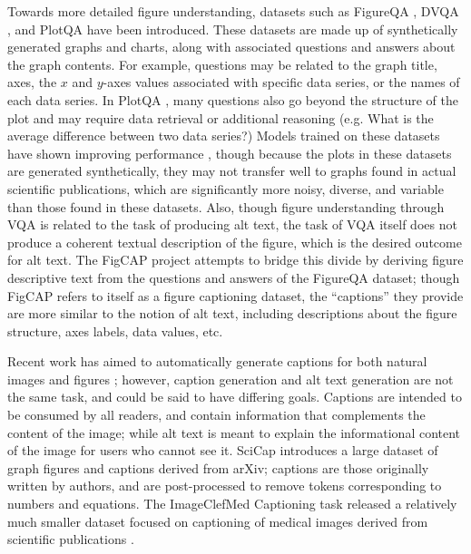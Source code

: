 \documentclass[sigconf]{acmart}
\begin{document}
Towards more detailed figure understanding, datasets such as FigureQA \citep{Kahou2018FigureQAAA}, DVQA \citep{Kafle2018DVQAUD}, and PlotQA \citep{Methani2020PlotQARO} have been introduced. These datasets are made up of synthetically generated graphs and charts, along with associated questions and answers about the graph contents. For example, questions may be related to the graph title, axes, the $x$ and $y$-axes values associated with specific data series, or the names of each data series. In PlotQA \citep{Kafle2018DVQAUD}, many questions also go beyond the structure of the plot and may require data retrieval or additional reasoning (e.g. What is the average difference between two data series?) Models trained on these datasets have shown improving performance \citep{Kahou2018FigureQAAA, Levy2021ClassificationRegressionFC}, though because the plots in these datasets are generated synthetically, they may not transfer well to graphs found in actual scientific publications, which are significantly more noisy, diverse, and variable than those found in these datasets. Also, though figure understanding through VQA is related to the task of producing alt text, the task of VQA itself does not produce a coherent textual description of the figure, which is the desired outcome for alt text. The FigCAP project \citep{Chen2019NeuralCG, Chen2019FigureCW} attempts to bridge this divide by deriving figure descriptive text from the questions and answers of the FigureQA \citep{Kahou2018FigureQAAA} dataset; though FigCAP refers to itself as a figure captioning dataset, the ``captions'' they provide are more similar to the notion of alt text, including descriptions about the figure structure, axes labels, data values, etc.

Recent work has aimed to automatically generate captions for both natural images \citep{Chen2015MicrosoftCC, Sharma2018ConceptualCA} and figures \citep{Hsu2021SciCapGC, Nicolson2021AEHRCCA}; however, caption generation and alt text generation are not the same task, and could be said to have differing goals. Captions are intended to be consumed by all readers, and contain information that complements the content of the image; while alt text is meant to explain the informational content of the image for users who cannot see it. SciCap \citep{Hsu2021SciCapGC} introduces a large dataset of graph figures and captions derived from arXiv; captions are those originally written by authors, and are post-processed to remove tokens corresponding to numbers and equations. The ImageClefMed Captioning task released a relatively much smaller dataset focused on captioning of medical images derived from scientific publications \cite{Nicolson2021AEHRCCA}. 
\end{document}
